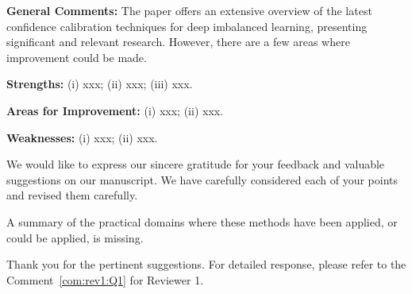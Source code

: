 
\reviewer

\begin{generalcomment}
    \textbf{General Comments:} The paper offers an extensive overview of the latest confidence calibration techniques for deep imbalanced learning, presenting significant and relevant research. However, there are a few areas where improvement could be made.
   
    \textbf{Strengths:} (i) xxx; (ii) xxx; (iii) xxx.

    \textbf{Areas for Improvement:} (i) xxx; (ii) xxx. 
     
    \textbf{Weaknesses:} (i) xxx; (ii) xxx. 

\end{generalcomment}
\begin{revmeta}[]
	We would like to express our sincere gratitude for your feedback and valuable suggestions on our manuscript. We have carefully considered each of your points and revised them carefully.
\end{revmeta}

\begin{revcomment}
A summary of the practical domains where these methods have been applied, or could be applied, is missing.
\end{revcomment}
\begin{revresponse}[]
	Thank you for the pertinent suggestions. 
    For detailed response, please refer to the Comment~\ref{com:rev1:Q1} for Reviewer 1. 
	
\end{revresponse}

\clearpage
\printbibliography[heading=bibintoc, heading=bibliography, title={References}, section=\therefsection]